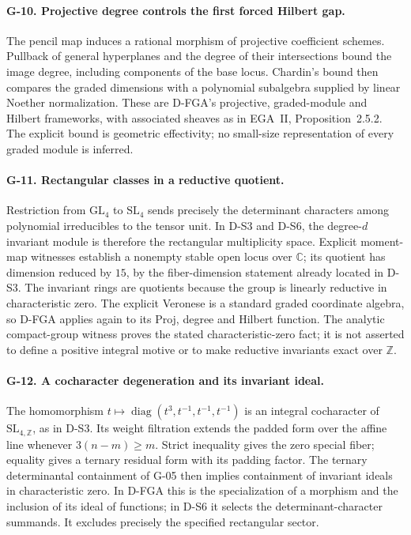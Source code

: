 \documentclass[11pt,a4paper]{article}
\theoremstyle{definition}\newtheorem{definition}{Definition}
\begin{document}
\paragraph{G-10. Projective degree controls the first forced Hilbert gap.}
The pencil map induces a rational morphism of projective coefficient schemes. Pullback of general hyperplanes and the degree of their intersections bound the image degree, including components of the base locus. Chardin's bound then compares the graded dimensions with a polynomial subalgebra supplied by linear Noether normalization. These are D-FGA's projective, graded-module and Hilbert frameworks, with associated sheaves as in EGA~II, Proposition~2.5.2. The explicit bound is geometric effectivity; no small-size representation of every graded module is inferred.

\paragraph{G-11. Rectangular classes in a reductive quotient.}
Restriction from $\mathrm{GL}_4$ to $\mathrm{SL}_4$ sends precisely the determinant characters among polynomial irreducibles to the tensor unit. In D-S3 and D-S6, the degree-$d$ invariant module is therefore the rectangular multiplicity space. Explicit moment-map witnesses establish a nonempty stable open locus over $\mathbb C$; its quotient has dimension reduced by $15$, by the fiber-dimension statement already located in D-S3. The invariant rings are quotients because the group is linearly reductive in characteristic zero. The explicit Veronese is a standard graded coordinate algebra, so D-FGA applies again to its Proj, degree and Hilbert function. The analytic compact-group witness proves the stated characteristic-zero fact; it is not asserted to define a positive integral motive or to make reductive invariants exact over $\mathbb Z$.

\paragraph{G-12. A cocharacter degeneration and its invariant ideal.}
The homomorphism $t\mapsto\operatorname{diag}(t^3,t^{-1},t^{-1},t^{-1})$ is an integral cocharacter of $\mathrm{SL}_{4,\mathbb Z}$, as in D-S3. Its weight filtration extends the padded form over the affine line whenever $3(n-m)\geq m$. Strict inequality gives the zero special fiber; equality gives a ternary residual form with its padding factor. The ternary determinantal containment of G-05 then implies containment of invariant ideals in characteristic zero. In D-FGA this is the specialization of a morphism and the inclusion of its ideal of functions; in D-S6 it selects the determinant-character summands. It excludes precisely the specified rectangular sector.
\end{document}
